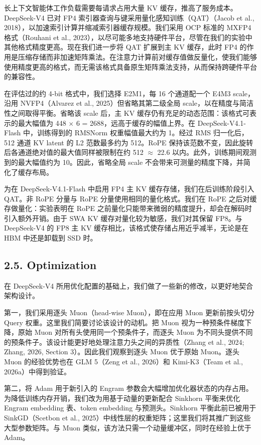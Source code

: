 长上下文智能体工作负载需要每请求占用大量 KV 缓存，推高了服务成本。DeepSeek-V4 已对 FP4 索引器查询与键采用量化感知训练（QAT）（Jacob et al., 2018），以加速索引计算并缩减索引器缓存规模。我们采用 OCP 标准的 MXFP4 格式（Rouhani et al., 2023），以尽可能多地支持硬件平台，尽管在我们的实验中其他格式精度更高。现在我们进一步将 QAT 扩展到主 KV 缓存，此时 FP4 的作用是压缩存储而非加速矩阵乘法。在注意力计算前对缓存值做反量化，使我们能够使用精度更高的格式，而无需该格式具备原生矩阵乘法支持，从而保持跨硬件平台的兼容性。

在评估过的约 4-bit 格式中，我们选择 E2M1，每 16 个通道配一个 E4M3 scale，沿用 NVFP4（Alvarez et al., 2025）但省略其第二级全局 scale，以在精度与简洁性之间取得平衡。省略该 scale 后，主 KV 缓存仍有充足的动态范围：该格式可表示的最大幅值为 448 \(\times\) 6 = 2688，远高于缓存的幅值上界。在 DeepSeek-V4.1-Flash 中，训练得到的 RMSNorm 权重幅值最大约为 1。经过 RMS 归一化后，512 通道 KV latent 的 L2 范数最多约为 512。RoPE 保持该范数不变，因此旋转后各通道绝对值的最大值同样被限制在约 512 \(\approx\) 22.6 以内。此外，训练期间观测到的最大幅值约为 10。因此，省略全局 scale 不会带来可测量的精度下降，并简化了缓存布局。

为在 DeepSeek-V4.1-Flash 中启用 FP4 主 KV 缓存存储，我们在后训练阶段引入 QAT。非 RoPE 分量与 RoPE 分量使用相同的量化格式。我们在 RoPE 之后对缓存做量化：实验表明在 RoPE 之前量化只能带来微弱的精度提升，却会在解码时引入额外开销。由于 SWA KV 缓存对量化较为敏感，我们对其保留 FP8。与 DeepSeek-V4 的 FP8 主 KV 缓存相比，该格式使存储占用近乎减半，无论是在 HBM 中还是卸载到 SSD 时。
\subsection{2.5. Optimization}\label{optimization}

在 DeepSeek-V4 所用优化配置的基础上，我们做了一些新的修改，以更好地契合架构设计。

第一，我们采用逐头 Muon（head-wise Muon），即在应用 Muon 更新前按头切分 Query 权重。这里我们简要讨论该设计的动机。把 Muon 视为一种预条件梯度下降，原始 Muon 对所有头使用同一个预条件子，而逐头 Muon 为不同头提供不同的预条件子。该设计能更好地处理注意力头之间的异质性（Zhang et al., 2024; Zhang, 2026, Section 3）。因此我们观察到逐头 Muon 优于原始 Muon。逐头 Muon 的经验优势也在 GLM 5（Zeng et al., 2026）和 Kimi-K3（Team et al., 2026a）中得到验证。

第二，将 Adam 用于新引入的 Engram 参数会大幅增加优化器状态的内存占用。为降低训练内存开销，我们改为用基于动量的更新配合 Sinkhorn 平衡来优化 Engram embedding 表、token embedding 与预测头。Sinkhorn 平衡此前已被用于 SinkGD（Scetbon et al., 2025）中线性层的权重矩阵；这里我们将其推广到这些大型参数矩阵。与 Muon 类似，该方法只需一个动量缓冲区，同时在经验上优于 Adam。

